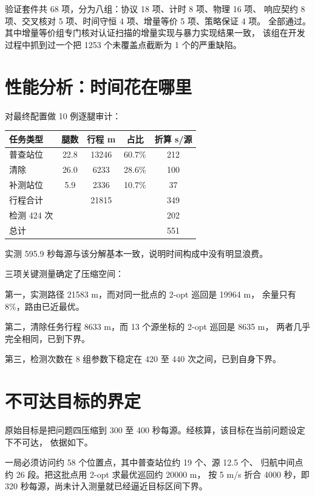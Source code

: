 验证套件共 68 项，分为八组：协议 18 项、计时 8 项、物理 16 项、
响应契约 8 项、交叉核对 5 项、时间守恒 4 项、增量等价 5 项、策略保证 4 项。
全部通过。其中增量等价组专门核对认证扫描的增量实现与暴力实现结果一致，
该组在开发过程中抓到过一个把 1253 个未覆盖点截断为 1 个的严重缺陷。

\section{性能分析：时间花在哪里}

对最终配置做 10 例逐腿审计：

\begin{center}
\begin{tabular}{lcccc}
\toprule
任务类型 & 腿数 & 行程 m & 占比 & 折算 s/源 \\
\midrule
普查站位 & 22.8 & 13246 & 60.7\% & 212 \\
清除 & 26.0 & 6233 & 28.6\% & 100 \\
补测站位 & 5.9 & 2336 & 10.7\% & 37 \\
\midrule
行程合计 & & 21815 & & 349 \\
检测 424 次 & & & & 202 \\
\midrule
总计 & & & & 551 \\
\bottomrule
\end{tabular}
\end{center}

实测 595.9 秒每源与该分解基本一致，说明时间构成中没有明显浪费。

三项关键测量确定了压缩空间：

第一，实测路径 21583 m，而对同一批点的 2-opt 巡回是 19964 m，
余量只有 8\%，路由已近最优。

第二，清除任务行程 8633 m，而 13 个源坐标的 2-opt 巡回是 8635 m，
两者几乎完全相同，已到下界。

第三，检测次数在 8 组参数下稳定在 420 至 440 次之间，已到自身下界。

\section{不可达目标的界定}

原始目标是把问题四压缩到 300 至 400 秒每源。经核算，该目标在当前问题设定下不可达，
依据如下。

一局必须访问约 58 个位置点，其中普查站位约 19 个、源 12.5 个、
归航中间点约 26 段。把这批点用 2-opt 求最优巡回约 20000 m，
按 5 m/s 折合 4000 秒，即 320 秒每源，尚未计入测量就已经逼近目标区间下界。

